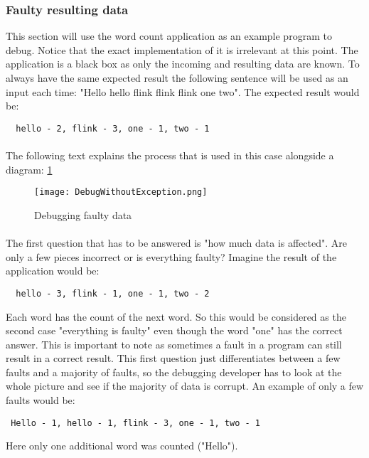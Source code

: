 \subsubsection{Faulty resulting data}
This section will use the word count application as an example program to debug. Notice that the exact implementation of it is irrelevant at this point. The application is a black box as only the incoming and resulting data are known. To always have the same expected result the following sentence will be used as an input each time: "Hello hello flink flink flink one two". The expected result would be:
\begin{lstlisting}
  hello - 2, flink - 3, one - 1, two - 1
\end{lstlisting}

\paragraph{} The following text explains the process that is used in this case alongside a diagram: \ref{debuggingFaultyData}

\begin{figure}[h!]
    \centering
      \texttt{[image: DebugWithoutException.png]}
      \caption{Debugging faulty data}
      \label{debuggingFaultyData}
\end{figure}

\paragraph{} The first question that has to be answered is
"how much data is affected". Are only a few pieces incorrect or is everything faulty? Imagine the result of the application would be:
\begin{lstlisting}
  hello - 3, flink - 1, one - 1, two - 2
\end{lstlisting}
  Each word has the count of the next word. So this would be considered as the second case "everything is faulty" even though the word "one" has the correct answer. This is important to note as sometimes a fault in a program can still result in a correct result. This first question just differentiates between a few faults and a majority of faults, so the debugging developer has to look at the whole picture and see if the majority of data is corrupt. An example of only a few faults would be:
\begin{lstlisting}
 Hello - 1, hello - 1, flink - 3, one - 1, two - 1
\end{lstlisting}
Here only one additional word was counted ("Hello").

